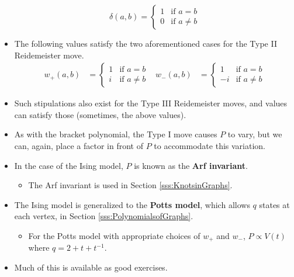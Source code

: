 \documentclass[titlepage]{article}
\numberwithin{figure}{section}
\numberwithin{table}{section}
\numberwithin{equation}{section}
\begin{document}
\begin{itemize}
    \begin{equation*}
        \delta(a,b)=
        \begin{cases}
            1 & \text{if }a=b\\
            0 & \text{if }a\neq b
        \end{cases}
    \end{equation*}
    \item The following values satisfy the two aforementioned cases for the Type II Reidemeister move.
    \begin{align*}
        w_+(a,b) &=
        \begin{cases}
            1 & \text{if }a=b\\
            i & \text{if }a\neq b
        \end{cases}&
        w_-(a,b) &=
        \begin{cases}
            1 & \text{if }a=b\\
            -i & \text{if }a\neq b
        \end{cases}
    \end{align*}
    \item Such stipulations also exist for the Type III Reidemeister moves, and values can satisfy those (sometimes, the above values).
    \item As with the bracket polynomial, the Type I move causes $P$ to vary, but we can, again, place a factor in front of $P$ to accommodate this variation.
    \item In the case of the Ising model, $P$ is known as the \textbf{Arf invariant}.
    \begin{itemize}
        \item The Arf invariant is used in Section \ref{sss:KnotsinGraphs}.
    \end{itemize}
    \item The Ising model is generalized to the \textbf{Potts model}, which allows $q$ states at each vertex, in Section \ref{sss:PolynomialsofGraphs}.
    \begin{itemize}
        \item For the Potts model with appropriate choices of $w_+$ and $w_-$, $P\propto V(t)$ where $q=2+t+t^{-1}$.
    \end{itemize}
    \item Much of this is available as good exercises.
\end{itemize}
\end{document}
